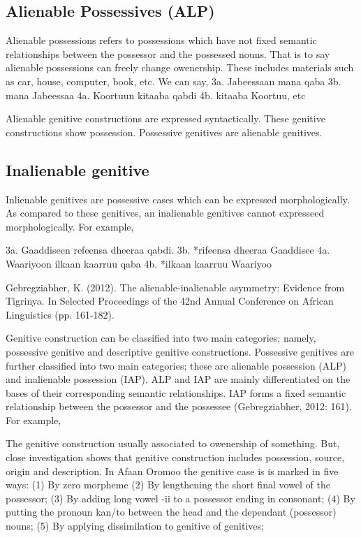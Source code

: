 \documentclass[11pt,a4paper]{article}
\begin{document}
	\subsection{Alienable Possessives (ALP)}
	
	Alienable possessions refers to possessions which have not fixed semantic relationships between the 
	possessor and the possessed nouns. That is to say alienable possessions can freely change owenership. These
	includes materials such as car, house, computer, book, etc. We can say,
	3a. Jabeessaan mana qaba
	3b. mana Jabeessaa
	4a. Koortuun kitaaba qabdi
	4b. kitaaba Koortuu, etc
	
	Alienable genitive constructions are expressed syntactically. These genitive constructions show possession. Possessive genitives are alienable genitives.
	
	\subsection{Inalienable genitive}
	
	Inlienable genitives are possessive cases which can be expressed morphologically. As compared to these genitives, an inalienable genitives cannot 
	expresseed morphologically. For example,
	
	3a. Gaaddiseen refeensa dheeraa qabdi.
	3b. *rifeensa dheeraa Gaaddisee
	4a. Waariyoon ilkaan kaarruu qaba
	4b. *ilkaan kaarruu Waariyoo
	
	Gebregziabher, K. (2012). The alienable-inalienable asymmetry: Evidence from Tigrinya. 
	In Selected Proceedings of the 42nd Annual Conference on African Linguistics (pp. 161-182).
	
	Genitive construction can be classified into two main categories; namely, possessive genitive and descriptive
	genitive constructions. Possessive genitives are further classified into two main categories; these are alienable possession (ALP)
	and inalienable possession (IAP). ALP and IAP are mainly differentiated on the bases 
	of their corresponding semantic relationships. IAP forms a fixed semantic relationship between the possessor and the 
	possessee (Gebregziabher, 2012: 161). For example,
	
	The genitive construction usually associated to owenership of something. But, close investigation shows that
	genitive construction includes possession, source, origin and description. In Afaan Oromoo the genitive case is 
	is marked in five ways: 
	(1) By zero morpheme 
	(2) By lengthening the short final vowel of the possessor;  
	(3) By adding long vowel -ii to a possessor ending in consonant;  
	(4) By putting the pronoun kan/to between the head and the dependant (possessor) nouns;   
	(5) By applying dissimilation to genitive of genitives;
	
\end{document}
